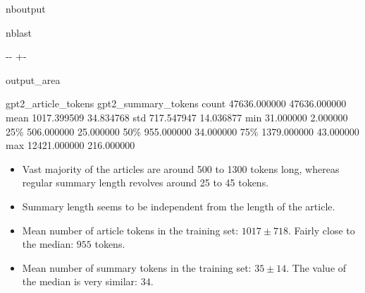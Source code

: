 \documentclass[letterpaper,10pt,english]{sphinxmanual}
\newlength\nbsphinxcodecellspacing
\begin{document}
\begin{sphinxuseclass}{nboutput}
\begin{sphinxuseclass}{nblast}
{

\kern-\sphinxverbatimsmallskipamount\kern-\baselineskip
\kern+\FrameHeightAdjust\kern-\fboxrule
\vspace{\nbsphinxcodecellspacing}

\begin{sphinxuseclass}{output_area}
\begin{sphinxuseclass}{}


\begin{sphinxVerbatim}[commandchars=\\\{\}]
\llap{\color{nbsphinxout}[87]:\,\hspace{\fboxrule}\hspace{\fboxsep}}       gpt2\_article\_tokens  gpt2\_summary\_tokens
count         47636.000000         47636.000000
mean           1017.399509            34.834768
std             717.547947            14.036877
min              31.000000             2.000000
25\%             506.000000            25.000000
50\%             955.000000            34.000000
75\%            1379.000000            43.000000
max           12421.000000           216.000000
\end{sphinxVerbatim}



\end{sphinxuseclass}
\end{sphinxuseclass}
}

\end{sphinxuseclass}
\end{sphinxuseclass}\begin{itemize}
\item {} 
\sphinxAtStartPar
Vast majority of the articles are around 500 to 1300 tokens long, whereas regular summary length revolves around 25 to 45 tokens.

\item {} 
\sphinxAtStartPar
Summary length seems to be independent from the length of the article.

\item {} 
\sphinxAtStartPar
Mean number of article tokens in the training set: \(1017\pm718\). Fairly close to the median: \(955\) tokens.

\item {} 
\sphinxAtStartPar
Mean number of summary tokens in the training set: \(35\pm14\). The value of the median is very similar: \(34\).

\end{itemize}
\end{document}
